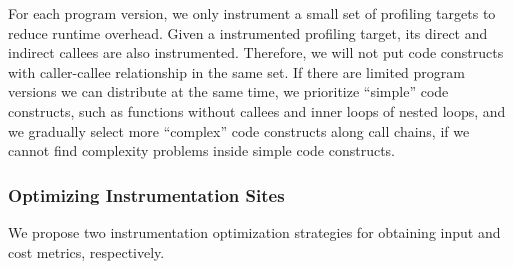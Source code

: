 For each program version, we only instrument a small set of profiling targets
to reduce runtime overhead.
Given a instrumented profiling target,
its direct and indirect callees are also instrumented. 
Therefore, we will not put code constructs with caller-callee 
relationship in the same set. 
If there are limited program versions we can distribute at the same time,
we prioritize ``simple'' code constructs, such as 
functions without callees and inner loops of nested loops,
and we gradually select more ``complex'' code constructs along call chains, 
if we cannot find complexity problems inside simple code constructs.




\subsubsection{Optimizing Instrumentation Sites}


We propose two instrumentation optimization strategies for obtaining
input and cost metrics, respectively. 

